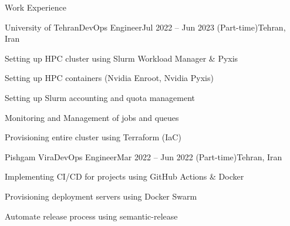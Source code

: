 \documentclass[]{main}
\begin{document}
\begin{section}{Work Experience}
 \begin{subsection}{University of Tehran}{DevOps Engineer}{Jul 2022 -- Jun 2023 (Part-time)}{Tehran, Iran}
     \item Setting up HPC cluster using Slurm Workload Manager \& Pyxis
     \item Setting up HPC containers (Nvidia Enroot, Nvidia Pyxis)
     \item Setting up Slurm accounting and quota management
     \item Monitoring and Management of jobs and queues
     \item Provisioning entire cluster using Terraform (IaC)
 \end{subsection}
 
 \begin{subsection}{Pishgam Vira}{DevOps Engineer}{Mar 2022 -- Jun 2022 (Part-time)}{Tehran, Iran}
     \item Implementing CI/CD for projects using GitHub Actions \& Docker
     \item Provisioning deployment servers using Docker Swarm
     \item Automate release process using semantic-release
 \end{subsection}
\end{section}

\end{document}
